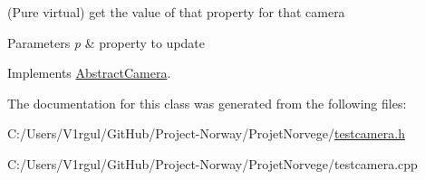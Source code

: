 (Pure virtual) get the value of that property for that camera 


\begin{DoxyParams}{Parameters}
{\em p} & property to update \\
\hline
\end{DoxyParams}


Implements \hyperlink{class_abstract_camera_acb48ab701cd02e78604a3ca1c695b1cf}{Abstract\-Camera}.



The documentation for this class was generated from the following files\-:\begin{DoxyCompactItemize}
\item 
C\-:/\-Users/\-V1rgul/\-Git\-Hub/\-Project-\/\-Norway/\-Projet\-Norvege/\hyperlink{testcamera_8h}{testcamera.\-h}\item 
C\-:/\-Users/\-V1rgul/\-Git\-Hub/\-Project-\/\-Norway/\-Projet\-Norvege/testcamera.\-cpp\end{DoxyCompactItemize}
